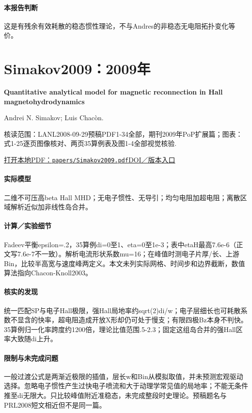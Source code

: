 \paragraph{本报告判断}这是有残余有效耗散的稳态惯性理论，不与Andres的非稳态无电阻拓扑变化等价。

\section{Simakov2009：2009年}\label{paper:Simakov2009}

\textbf{Quantitative analytical model for magnetic reconnection in Hall magnetohydrodynamics}\citep{Simakov2009}\

Andrei N. Simakov;  Luis Chacòn.

\textsf{核读范围：}LANL2008-09-29预稿PDF1-34全部，期刊2009年PoP扩展篇；\textsf{图表：}式1-25逐页图像核对、两页35算例表及图1-4全部视觉核验.

\href{run:papers/Simakov2009.pdf}{打开本地PDF：\texttt{papers/Simakov2009.pdf}}\quad\href{https://doi.org/10.1063/1.3077269}{DOI／版本入口}

\paragraph{实际模型}二维不可压高beta Hall MHD；无电子惯性、无导引；均匀电阻加超电阻；离散区域解析近似加非线性岛合并。

\paragraph{计算／实验细节}Fadeev平衡epsilon=.2，35算例di=0至1、eta=0至1e-3；表中etaH最高7.6e-6（正文写7.6e-7不一致）。解析电流形状系数mu=16；在峰值时测电子片厚/长、上游Bin，比较半高宽与速度峰两定义。本文未列实际网格、时间步和边界截断，数值算法指向Chacon-Knoll2003。

\paragraph{核实的发现}统一匹配SP与电子Hall极限，强Hall局地率约sqrt(2)di/w；电子层细长也可耗散系数不显含的快率，超电阻造成开放X形却仍可处于慢支；有限四极Bz本身不判快。35算例归一化率跨度约1200倍，理论比值范围.5-2.3；固定这组岛合并的强Hall区率大致随di上升。

\paragraph{限制与未完成问题}一般过渡公式是两渐近极限的插值，层长w和Bin从模拟取值，并未预测宏观驱动选择。忽略电子惯性产生过快电子喷流和大于动理学常见值的局地率；不能无条件推至di无限大。只比较峰值附近准稳态，未完成整段时史理论。预稿题名与PRL2008短文相近但不是同一篇。

